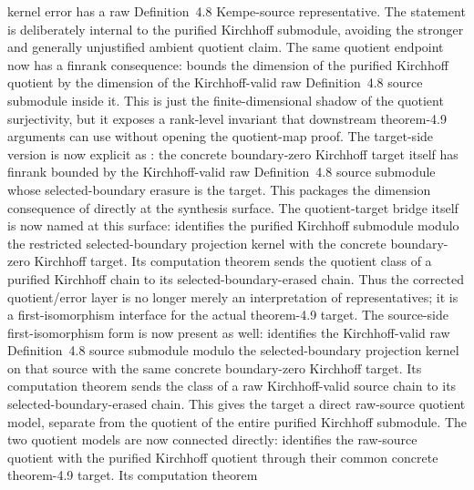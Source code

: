 \documentclass[11pt]{article}
\begin{document}
kernel error has a raw Definition~4.8 Kempe-source representative.  The
statement is deliberately internal to the purified Kirchhoff submodule, avoiding
the stronger and generally unjustified ambient quotient claim.
The same quotient endpoint now has a finrank consequence:
 bounds the
dimension of the purified Kirchhoff quotient by the dimension of the
Kirchhoff-valid raw Definition~4.8 source submodule inside it.  This is just the
finite-dimensional shadow of the quotient surjectivity, but it exposes a
rank-level invariant that downstream theorem-4.9 arguments can use without
opening the quotient-map proof.
The target-side version is now explicit as
: the concrete
boundary-zero Kirchhoff target itself has finrank bounded by the
Kirchhoff-valid raw Definition~4.8 source submodule whose selected-boundary
erasure is the target.  This packages the dimension consequence of
 directly at the synthesis surface.
The quotient-target bridge itself is now named at this surface:
identifies the purified Kirchhoff submodule modulo the restricted
selected-boundary projection kernel with the concrete boundary-zero Kirchhoff
target.  Its computation theorem
sends the quotient class of a purified Kirchhoff chain to its
selected-boundary-erased chain.  Thus the corrected quotient/error layer is no
longer merely an interpretation of representatives; it is a first-isomorphism
interface for the actual theorem-4.9 target.
The source-side first-isomorphism form is now present as well:
 identifies
the Kirchhoff-valid raw Definition~4.8 source submodule modulo the
selected-boundary projection kernel on that source with the same concrete
boundary-zero Kirchhoff target.  Its computation theorem
sends the class of a raw Kirchhoff-valid source chain to its
selected-boundary-erased chain.  This gives the target a direct raw-source
quotient model, separate from the quotient of the entire purified Kirchhoff
submodule.
The two quotient models are now connected directly:
identifies the raw-source quotient with the purified Kirchhoff quotient through
their common concrete theorem-4.9 target.  Its computation theorem
\end{document}
